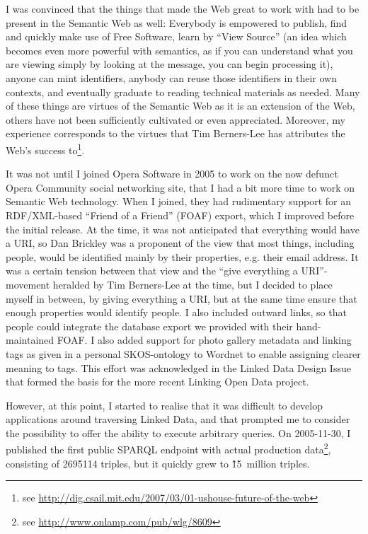 I was convinced that the things that made the Web great to work with
had to be present in the Semantic Web as well: Everybody is empowered
to publish, find and quickly make use of Free Software, learn by
``View Source'' (an idea which becomes even more powerful with
semantics, as if you can understand what you are viewing simply by
looking at the message, you can begin processing it), anyone can mint
identifiers, anybody can reuse those identifiers in their own
contexts, and eventually graduate to reading technical materials as
needed. Many of these things are virtues of the Semantic Web as it is
an extension of the Web, others have not been sufficiently cultivated
or even appreciated. Moreover, my experience corresponds to the
virtues that Tim Berners-Lee has attributes the Web's success
to\footnote{see
  \url{http://dig.csail.mit.edu/2007/03/01-ushouse-future-of-the-web}}.

It was not until I joined Opera Software in 2005 to work on the now
defunct Opera Community social networking site, that I had a bit more
time to work on Semantic Web technology. When I joined, they had
rudimentary support for an RDF/XML-based ``Friend of a Friend'' (FOAF)
export, which I improved before the initial release. At the time, it
was not anticipated that everything would have a URI, so Dan Brickley
was a proponent of the view that most things, including people, would
be identified mainly by their properties, e.g. their email address. It
was a certain tension between that view and the ``give everything a
URI''-movement heralded by Tim Berners-Lee at the time, but I decided
to place myself in between, by giving everything a URI, but at the
same time ensure that enough properties would identify people. I also
included outward links, so that people could integrate the database
export we provided with their hand-maintained FOAF. I also added
support for photo gallery metadata and linking tags as given in a
personal SKOS-ontology to Wordnet to enable assigning clearer meaning
to tags. This effort was acknowledged in the Linked Data Design
Issue\cite{linkeddataissue} that formed the basis for the more recent Linking
Open Data project.

However, at this point, I started to realise that it was difficult to
develop applications around traversing Linked Data, and that
prompted me to consider the possibility to offer the ability to
execute arbitrary queries. On 2005-11-30, I published the first public
SPARQL endpoint with actual production data\footnote{see
  \url{http://www.onlamp.com/pub/wlg/8609}}, consisting of 2695114
triples, but it quickly grew to \~15~million triples.


